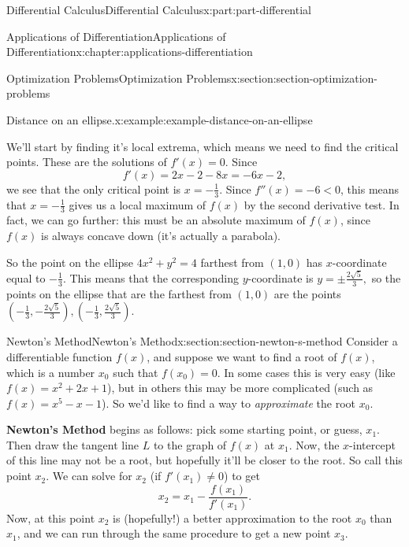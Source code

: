 \documentclass[twoside,10pt,]{tufte-book}
\newcommand{\terminology}[1]{\textbf{#1}}
\numberwithin{equation}{part}
\begin{document}
\begin{partptx}{Differential Calculus}{}{Differential Calculus}{}{}{x:part:part-differential}
\begin{chapterptx}{Applications of Differentiation}{}{Applications of Differentiation}{}{}{x:chapter:applications-differentiation}
\begin{sectionptx}{Optimization Problems}{}{Optimization Problems}{}{}{x:section:section-optimization-problems}
\begin{example}{Distance on an ellipse.}{x:example:example-distance-on-an-ellipse}
%
\par
We'll start by finding it's local extrema, which means we need to find the critical points. These are the solutions of \(f'(x) = 0\). Since%
\begin{equation*}
f'(x) = 2x - 2 - 8x = -6x - 2,
\end{equation*}
we see that the only critical point is \(x = -\frac{1}{3}\). Since \(f''(x) = -6 < 0\), this means that \(x = -\frac{1}{3}\) gives us a local maximum of \(f(x)\) by the second derivative test. In fact, we can go further: this must be an absolute maximum of \(f(x)\), since \(f(x)\) is always concave down (it's actually a parabola).%
\par
So the point on the ellipse \(4x^{2} + y^{2} = 4\) farthest from \((1,0)\) has \(x\)-coordinate equal to \(-\frac{1}{3}\). This means that the corresponding \(y\)-coordinate is \(y = \pm\frac{2\sqrt{5}}{3},\) so the points on the ellipse that are the farthest from \((1,0)\) are the points \((-\frac{1}{3}, -\frac{2\sqrt{5}}{3}), (-\frac{1}{3}, \frac{2\sqrt{5}}{3}).\)%
\end{example}
\end{sectionptx}
%
%
\typeout{************************************************}
\typeout{************************************************}
%
\begin{sectionptx}{Newton's Method}{}{Newton's Method}{}{}{x:section:section-newton-s-method}
Consider a differentiable function \(f(x)\), and suppose we want to find a root of \(f(x)\), which is a number \(x_{0}\) such that \(f(x_{0}) = 0\). In some cases this is very easy (like \(f(x) = x^{2} + 2x + 1\)), but in others this may be more complicated (such as \(f(x) = x^{5} - x  - 1\)). So we'd like to find a way to \emph{approximate} the root \(x_{0}\).%
\par
\terminology{Newton's Method} begins as follows: pick some starting point, or guess, \(x_{1}\). Then draw the tangent line \(L\) to the graph of \(f(x)\) at \(x_{1}\). Now, the \(x\)-intercept of this line may not be a root, but hopefully it'll be closer to the root. So call this point \(x_{2}\). We can solve for \(x_{2}\) (if \(f'(x_{1})\neq0\)) to get%
\begin{equation*}
x_{2} = x_{1} - \frac{f(x_{1})}{f'(x_{1})}.
\end{equation*}
Now, at this point \(x_{2}\) is (hopefully!) a better approximation to the root \(x_{0}\) than \(x_{1}\), and we can run through the same procedure to get a new point \(x_{3}\).%
\par

\end{sectionptx}
\end{chapterptx}
\end{partptx}
\end{document}
